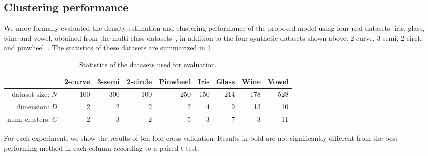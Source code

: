 
\subsection{Clustering performance}
We more formally evaluated the density estimation and clustering performance of the proposed model using four real datasets: iris, glass, wine and vowel, obtained from the \LIBSVM{} multi-class datasets~\citep{chang2011libsvm}, in addition to the four synthetic datasets shown above: 2-curve, 3-semi, 2-circle and pinwheel~\citep{adams2009archipelago}.
The statistics of these datasets are summarized in \cref{tab:statistics}.

\begin{table}[ht!]
\centering
\caption[Datasets used for evaluation of the \siwmm{}]
{Statistics of the datasets used for evaluation.}
\label{tab:statistics}
\begin{tabular}{rrrrrrrrr}
\hline
 & 2-curve & 3-semi & 2-circle & Pinwheel & Iris & Glass  & Wine  & Vowel  \\
\hline
dataset size: $N$ & 100 & 300 & 100 & 250 & 150 & 214 & 178 & 528 \\
dimension: $D$ & 2 & 2 & 2 & 2 & 4 & 9 & 13 & 10 \\
num. clusters: $C$ & 2 & 3 & 2 & 5 & 3 & 7 & 3 & 11 \\
\hline
\end{tabular}
\end{table}
%
For each experiment, we show the results of ten-fold cross-validation.
Results in bold are not significantly different from the best performing method in each column according to a paired t-test.
%
%

